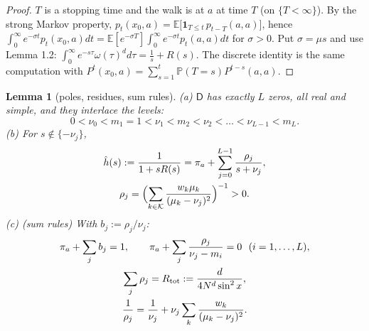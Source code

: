 \documentclass[11pt,a4paper]{article}
\newtheorem{lemma}[theorem]{Lemma}
\theoremstyle{definition}
\theoremstyle{remark}
\begin{document}
\begin{proof}
$T$ is a stopping time and the walk is at $a$ at time $T$ (on $\{T<\infty\}$). By the strong Markov property, $p_t(x_0,a)=\mathbb E\bigl[\mathbf 1_{T\le t}\,p_{t-T}(a,a)\bigr]$, hence $\int_0^\infty e^{-\sigma t}p_t(x_0,a)dt=\mathbb E[e^{-\sigma T}]\int_0^\infty e^{-\sigma t}p_t(a,a)dt$ for $\sigma>0$. Put $\sigma=\mu s$ and use Lemma 1.2: $\int_0^\infty e^{-s\tau}\omega(\tau)^d d\tau=\frac1s+R(s)$. The discrete identity is the same computation with $P^t(x_0,a)=\sum_{s=1}^t\mathbb P(T=s)P^{t-s}(a,a)$.
\end{proof}

\begin{lemma}[{poles, residues, sum rules}]
(a) $\mathsf D$ has exactly $L$ zeros, all real and simple, and they interlace the levels:
\begin{equation*}
0<\nu_0<m_1=1<\nu_1<m_2<\nu_2<\dots<\nu_{L-1}<m_L .
\end{equation*}
(b) For $s\notin\{-\nu_j\}$,
\begin{gather*}
\hat h(s):=\frac{1}{1+sR(s)}=\pi_a+\sum_{j=0}^{L-1}\frac{\rho_j}{s+\nu_j}, \\
\rho_j=\Bigl(\sum_{k\in\mathcal K}\frac{w_k\mu_k}{(\mu_k-\nu_j)^2}\Bigr)^{-1}>0 .
\end{gather*}
(c) (sum rules) With $b_j:=\rho_j/\nu_j$:
\begin{gather*}
\pi_a+\sum_jb_j=1, \qquad \pi_a+\sum_j\frac{\rho_j}{\nu_j-m_i}=0\ \ (i=1,\dots,L), \\
\sum_j\rho_j=R_{\rm tot}:=\frac{d}{4N^d\sin^2x}, \\
\frac1{\rho_j}=\frac1{\nu_j}+\nu_j\sum_{k}\frac{w_k}{(\mu_k-\nu_j)^2}.
\end{gather*}
\end{lemma}
\end{document}
